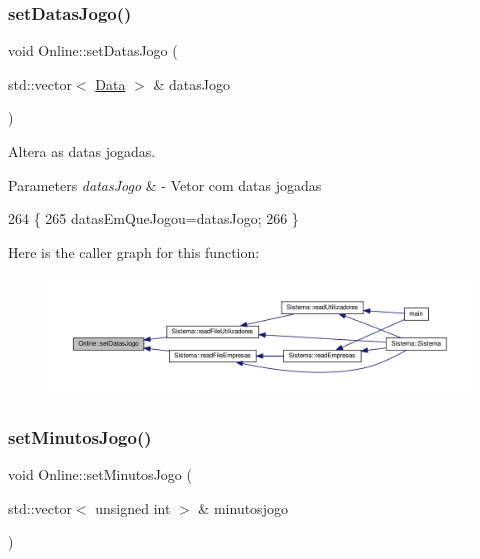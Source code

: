 \subsubsection{\texorpdfstring{set\+Datas\+Jogo()}{setDatasJogo()}}
{\footnotesize\ttfamily void Online\+::set\+Datas\+Jogo (\begin{DoxyParamCaption}\item[{std\+::vector$<$ \hyperlink{classData}{Data} $>$ \&}]{datas\+Jogo }\end{DoxyParamCaption})}



Altera as datas jogadas. 


\begin{DoxyParams}{Parameters}
{\em datas\+Jogo} & -\/ Vetor com datas jogadas \\
\hline
\end{DoxyParams}

\begin{DoxyCode}
264                                                    \{
265     datasEmQueJogou=datasJogo;
266 \}
\end{DoxyCode}
Here is the caller graph for this function\+:
\nopagebreak
\begin{figure}[H]
\begin{center}
\leavevmode
\includegraphics[width=350pt]{classOnline_a3c0b8d3393271eabfa702629c979fb93_icgraph}
\end{center}
\end{figure}
\mbox{\label{classOnline_a71cc818cd9b8020a470efc14f636a9f9}} 
\subsubsection{\texorpdfstring{set\+Minutos\+Jogo()}{setMinutosJogo()}}
{\footnotesize\ttfamily void Online\+::set\+Minutos\+Jogo (\begin{DoxyParamCaption}\item[{std\+::vector$<$ unsigned int $>$ \&}]{minutosjogo }\end{DoxyParamCaption})}



